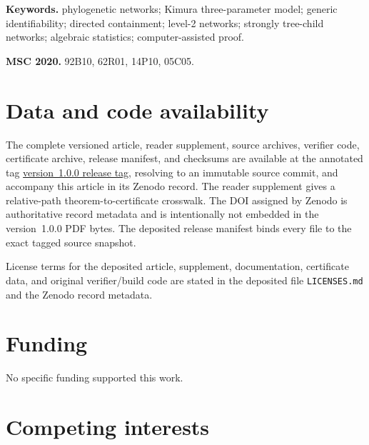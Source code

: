 \documentclass[11pt]{article}
\theoremstyle{remark}
\newcommand{\1}{\mathbf 1}
\begin{document}
\noindent\textbf{Keywords.} phylogenetic networks; Kimura three-parameter
model; generic identifiability; directed containment; level-2 networks;
strongly tree-child networks; algebraic statistics; computer-assisted proof.

\medskip
\noindent\textbf{MSC 2020.} 92B10, 62R01, 14P10, 05C05.



















\section*{Data and code availability}

The complete versioned article, reader supplement, source archives, verifier
code, certificate archive, release manifest, and checksums are available at
the annotated tag
\href{https://github.com/AlecKriebel/Math/tree/k3p-level2-identifiability-v1.0.0/k3p_level2_identifiability_final}
{version~1.0.0 release tag}, resolving to an immutable
source commit, and accompany this article in its
Zenodo record.  The reader supplement gives a relative-path
theorem-to-certificate crosswalk.  The DOI assigned by Zenodo is authoritative
record metadata and is intentionally not embedded in the version~1.0.0 PDF
bytes.  The deposited release manifest binds every file to the exact tagged
source snapshot.

License terms for the deposited article, supplement, documentation,
certificate data, and original verifier/build code are stated in the deposited
file \texttt{LICENSES.md} and the Zenodo record metadata.

\section*{Funding}

No specific funding supported this work.

\section*{Competing interests}
\end{document}
